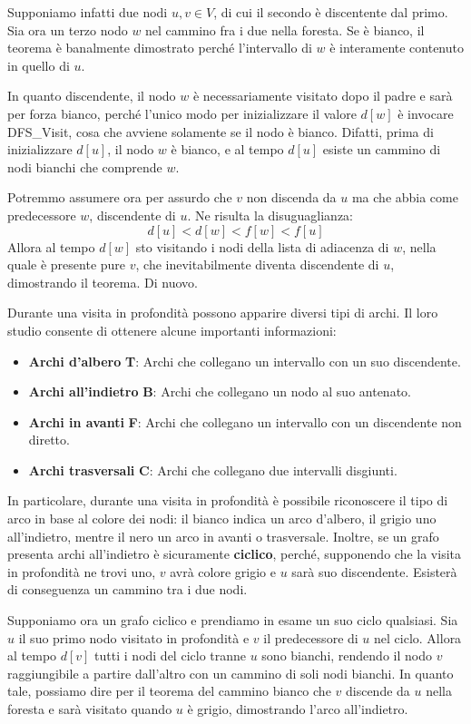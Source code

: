 \noindent Supponiamo infatti due nodi $u,v\in V$, di cui il secondo è discentente dal primo. Sia ora un terzo nodo $w$ nel cammino fra i due nella foresta. Se è bianco, il teorema è banalmente dimostrato perché l'intervallo di $w$ è interamente contenuto in quello di $u$.\par
In quanto discendente, il nodo $w$ è necessariamente visitato dopo il padre e sarà per forza bianco, perché l'unico modo per inizializzare il valore $d[w]$ è invocare DFS\_Visit, cosa che avviene solamente se il nodo è bianco. Difatti, prima di inizializzare $d[u]$, il nodo $w$ è bianco, e al tempo $d[u]$ esiste un cammino di nodi bianchi che comprende $w$.\par
Potremmo assumere ora per assurdo che $v$ non discenda da $u$ ma che abbia come predecessore $w$, discendente di $u$. Ne risulta la disuguaglianza: \[d[u] < d[w] < f[w] < f[u]\]
\noindent Allora al tempo $d[w]$ sto visitando i nodi della lista di adiacenza di $w$, nella quale è presente pure $v$, che inevitabilmente diventa discendente di $u$, dimostrando il teorema. Di nuovo.\newline

\noindent Durante una visita in profondità possono apparire diversi tipi di archi. Il loro studio consente di ottenere alcune importanti informazioni: \begin{itemize}
	\item \textbf{Archi d'albero} \textbf{T}: Archi che collegano un intervallo con un suo discendente.
	\item \textbf{Archi all'indietro} \textbf{B}: Archi che collegano un nodo al suo antenato.
	\item \textbf{Archi in avanti} \textbf{F}: Archi che collegano un intervallo con un discendente non diretto.
	\item \textbf{Archi trasversali} \textbf{C}: Archi che collegano due intervalli disgiunti.
\end{itemize}
\noindent In particolare, durante una visita in profondità è possibile riconoscere il tipo di arco in base al colore dei nodi: il bianco indica un arco d'albero, il grigio uno all'indietro, mentre il nero un arco in avanti o trasversale. Inoltre, se un grafo presenta archi all'indietro è sicuramente \textbf{ciclico}, perché, supponendo che la visita in profondità ne trovi uno, $v$ avrà colore grigio e $u$ sarà suo discendente. Esisterà di conseguenza un cammino tra i due nodi.\par
Supponiamo ora un grafo ciclico e prendiamo in esame un suo ciclo qualsiasi. Sia $u$ il suo primo nodo visitato in profondità e $v$ il predecessore di $u$ nel ciclo. Allora al tempo $d[v]$ tutti i nodi del ciclo tranne $u$ sono bianchi, rendendo il nodo $v$ raggiungibile a partire dall'altro con un cammino di soli nodi bianchi. In quanto tale, possiamo dire per il teorema del cammino bianco che $v$ discende da $u$ nella foresta e sarà visitato quando $u$ è grigio, dimostrando l'arco all'indietro.

